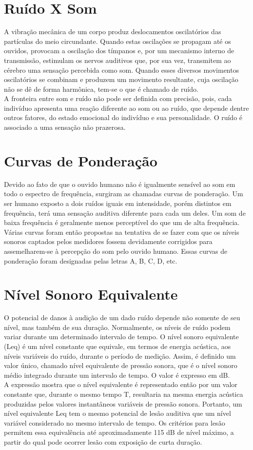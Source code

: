 \section{\textbf{Ruído X Som}}
A vibração mecânica de um corpo produz deslocamentos oscilatórios das partículas do meio circundante. Quando estas oscilações se propagam até os ouvidos, provocam a oscilação dos tímpanos e, por um mecanismo interno de transmissão, estimulam os nervos auditivos que, por sua vez, transmitem ao cérebro uma sensação percebida como som. Quando esses diversos movimentos oscilatórios se combinam e produzem um movimento resultante, cuja oscilação não se dê de forma harmônica, tem-se o que é chamado de ruído. \\
A fronteira entre som e ruído não pode ser definida com precisão, pois, cada indivíduo apresenta uma reação diferente ao som ou ao ruído, que depende dentre outros fatores, do estado emocional do indivíduo e sua personalidade. O ruído é associado a uma sensação não prazerosa.


\section{\textbf{Curvas de Ponderação}}
Devido ao fato de que o ouvido humano não é igualmente sensível ao som em todo o espectro de frequência, surgiram as chamadas curvas de ponderação. Um ser humano exposto a dois ruídos iguais em intensidade, porém distintos em frequência, terá uma sensação auditiva diferente para cada um deles. Um som de baixa frequência é geralmente menos perceptível do que um de alta frequência.  \\
Várias curvas foram então propostas na tentativa de se fazer com que os níveis sonoros captados pelos medidores fossem devidamente corrigidos para assemelharem-se à percepção do som pelo ouvido humano. Essas curvas de ponderação foram designadas pelas letras A, B, C, D, etc.


\section{\textbf{Nível Sonoro Equivalente} }
O potencial de danos à audição de um dado ruído depende não somente de seu nível, mas também de sua duração. Normalmente, os níveis de ruído podem variar durante um determinado intervalo de tempo. O nível sonoro equivalente (Leq) é um nível constante que equivale, em termos de energia acústica, aos níveis variáveis do ruído, durante o período de medição. Assim, é definido um valor único, chamado nível equivalente de pressão sonora, que é o nível sonoro médio integrado durante um intervalo de tempo. O valor é expresso em dB. \\
A expressão mostra que o nível equivalente é representado então por um valor constante que, durante o mesmo tempo T, resultaria na mesma energia acústica produzidas pelos valores instantâneos variáveis de pressão sonora. 
Portanto, um nível equivalente Leq tem o mesmo potencial de lesão auditiva que um nível variável considerado no mesmo intervalo de tempo. Os critérios para lesão permitem essa equivalência até aproximadamente 115 dB de nível máximo, a partir do qual pode ocorrer lesão com exposição de curta duração.


